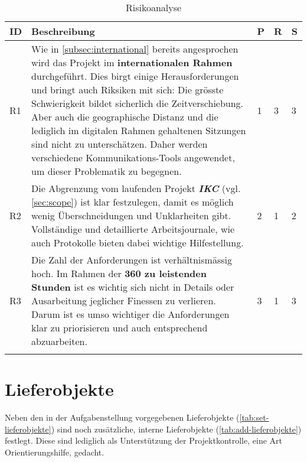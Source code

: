 \begin{longtable}{|p{0.5cm} | p{7cm} | p{1cm}|  p{1cm}|  p{1cm}|}
  \hline
    ID & Beschreibung &  P & R & S \\\hline
    R1 & Wie in \autoref{subsec:international} bereits angesprochen wird das Projekt im \textbf{internationalen Rahmen} durchgeführt. Dies birgt einige Herausforderungen und bringt auch Riksiken mit sich: Die grösste Schwierigkeit bildet sicherlich die Zeitverschiebung. Aber auch die geographische Distanz und die lediglich im digitalen Rahmen gehaltenen Sitzungen sind nicht zu unterschätzen. Daher werden verschiedene Kommunikations-Tools angewendet, um dieser Problematik zu begegnen. & 1 & 3 & 3\\\hline
    R2 & Die Abgrenzung vom laufenden Projekt \textbf{\textit{IKC}} (vgl. \autoref{sec:scope}) ist klar festzulegen, damit es möglich wenig Überschneidungen und Unklarheiten gibt. Vollständige und detaillierte Arbeitsjournale, wie auch Protokolle bieten dabei wichtige Hilfestellung.  & 2 & 1 & 2\\\hline
    R3 & Die Zahl der Anforderungen ist verhältnismässig hoch. Im Rahmen der \textbf{360 zu leistenden Stunden} ist es wichtig sich nicht in Details oder Ausarbeitung jeglicher Finessen zu verlieren. Darum ist es umso wichtiger die Anforderungen klar zu priorisieren und auch entsprechend abzuarbeiten.  & 3 & 1 & 3\\\hline
    \caption{Risikoanalyse}
  \label{tab:risikoanalyse}
\end{longtable}

\section{Lieferobjekte}\label{lieferobjekte}

Neben den in der Aufgabenstellung vorgegebenen Lieferobjekte (\autoref{tab:set-lieferobjekte}) sind noch zusätzliche, interne Lieferobjekte (\autoref{tab:add-lieferobjekte}) festlegt. Diese sind lediglich als Unterstützung der Projektkontrolle, eine Art Orientierungshilfe, gedacht.

